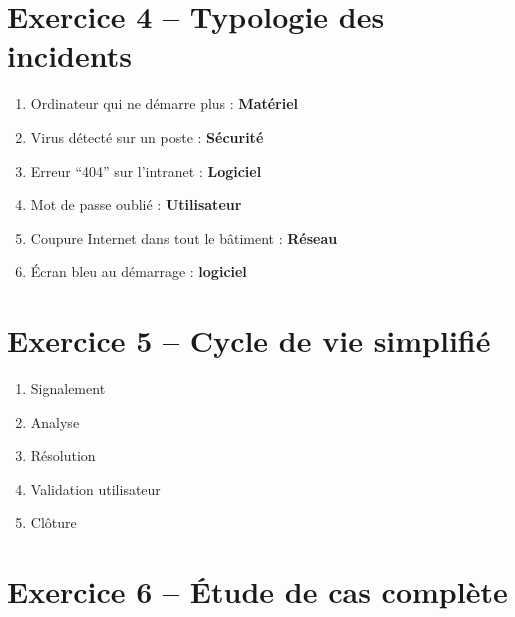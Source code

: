 \documentclass[12pt,a4paper]{extarticle}
\begin{document}
\section*{Exercice 4 -- Typologie des incidents}

\begin{enumerate}
    \item Ordinateur qui ne démarre plus : \textbf{Matériel}
    \item Virus détecté sur un poste : \textbf{Sécurité}
    \item Erreur “404” sur l’intranet : \textbf{Logiciel}
    \item Mot de passe oublié : \textbf{Utilisateur}
    \item Coupure Internet dans tout le bâtiment : \textbf{Réseau}
    \item Écran bleu au démarrage : \textbf{logiciel}
\end{enumerate}

\vspace{0.5cm}


\section*{Exercice 5 -- Cycle de vie simplifié}

\begin{enumerate}
    \item Signalement
    \item Analyse
    \item Résolution
    \item Validation utilisateur
    \item Clôture
\end{enumerate}

\vspace{0.5cm}


\section*{Exercice 6 -- Étude de cas complète}
\end{document}
